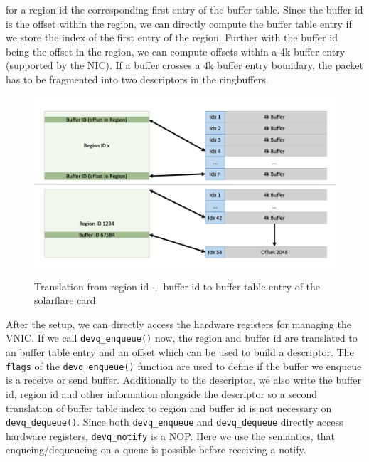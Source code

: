 \documentclass[a4paper,11pt,twoside]{report}
\begin{document}
for a region id the corresponding first entry of the buffer table. Since the buffer id is the
offset within the region, we can directly compute the buffer table entry if we store the index
of the first entry of the region. Further with the buffer id being the offset in the region, we
can compute offsets within a 4k buffer entry (supported by the NIC). If a buffer crosses 
a 4k buffer entry boundary, the packet has to be fragmented into two descriptors in the ringbuffers. 
\begin{figure}[h]
	\caption{Translation from region id + buffer id to buffer table entry of the solarflare card}
	\includegraphics[width=\textwidth]{pics/sfn5122f.pdf}
	\label{fig:translation}
\end{figure}  

After the setup, we can directly access the hardware registers for managing the VNIC. If we call
\texttt{devq\_enqueue()} now, the region and buffer id are translated to an buffer table 
entry and an offset which can be used to build a descriptor. The \texttt{flags} of the 
\texttt{devq\_enqueue()} function are used to define if the buffer we enqueue is a receive 
or send buffer. Additionally to the descriptor, we also write the buffer id, region id and 
other information alongside the descriptor so a second translation of 
buffer table index to region and buffer id is not necessary on \texttt{devq\_dequeue()}. 
Since both \texttt{devq\_enqueue} and \texttt{devq\_dequeue} directly access hardware 
registers, \texttt{devq\_notify} is a NOP. Here we use the semantics, that enqueing/dequeueing 
on a queue is possible before receiving a notify.
\end{document}
